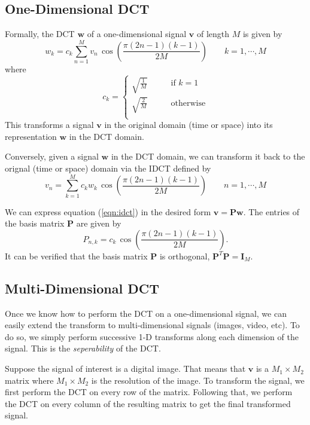 \subsection{One-Dimensional DCT}
Formally, the DCT $\bm w$ of a one-dimensional signal $\bm v$ of length $M$ is given by
\begin{equation}
  \label{eqn:dct_basis}
  w_k = c_k \sum_{n=1}^{M} v_n \, \cos\left(\frac{\pi(2n-1)(k-1)}{2M}\right) \qquad k = 1,\cdots,M
\end{equation}
where
\begin{equation*}
  c_k = \left\{\begin{array}{ll}
  \sqrt{\frac{1}{M}} & \qquad\mbox{if $k=1$}\\
  \sqrt{\frac{2}{M}} & \qquad\mbox{otherwise}\\
  \end{array}\right.
\end{equation*}
This transforms a signal $\bm v$ in the original domain (time or space) into its representation $\bm w$ in the DCT domain.

Conversely, given a signal $\bm w$ in the DCT domain, we can transform it back to the orignal (time or space) domain via the IDCT defined by
\begin{equation}
  \label{eqn:idct}
  v_n = \sum_{k=1}^M c_k w_k  \, \cos\left(\frac{\pi(2n-1)(k-1)}{2M}\right) \qquad n = 1,\cdots,M
\end{equation}

We can express equation (\ref{eqn:idct}) in the desired form $\bm v=\bm P\bm w$.
The entries of the basis matrix $\bm P$ are given by
\begin{equation}
  \label{eqn:idct_basis}
  P_{n,k} = c_k\, \cos\left(\frac{\pi(2n-1)(k-1)}{2M}\right).
\end{equation}
It can be verified that the basis matrix $\bm P$ is orthogonal, $\bm P^T\bm P=\bm I_M$.

\subsection{Multi-Dimensional DCT}
Once we know how to perform the DCT on a one-dimensional signal, we can easily extend the transform to multi-dimensional signals (images, video, etc).
To do so, we simply perform successive 1-D transforms along each dimension of the signal.
This is the \emph{seperability} of the DCT.

Suppose the signal of interest is a digital image.
That means that $\bm v$ is a $M_1\times M_2$ matrix where $M_1\times M_2$ is the resolution of the image.
To transform the signal, we first perform the DCT on every row of the matrix.
Following that, we perform the DCT on every column of the resulting matrix to get the final transformed signal.

